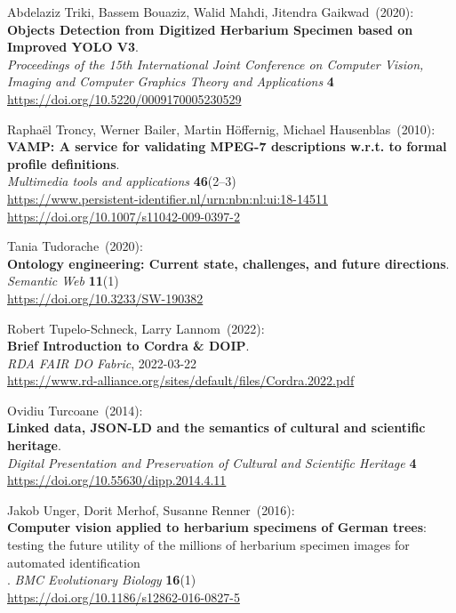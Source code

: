 \begin{thebibliography}{9}
Abdelaziz Triki, Bassem Bouaziz, Walid Mahdi, Jitendra Gaikwad~(2020): \\
\textbf{Objects Detection from Digitized Herbarium Specimen based on Improved YOLO V3}.\\
\emph{Proceedings of the 15th International Joint Conference on Computer Vision, Imaging and Computer Graphics Theory and Applications} 
\textbf{4}\\
\url{https://doi.org/10.5220/0009170005230529}

Raphaël Troncy, Werner Bailer, Martin Höffernig, Michael Hausenblas~(2010): \\
\textbf{VAMP: A service for validating MPEG-7 descriptions w.r.t. to formal profile definitions}.\\
\emph{Multimedia tools and applications} \textbf{46}(2--3) \\
\url{https://www.persistent-identifier.nl/urn:nbn:nl:ui:18-14511}\\
\url{https://doi.org/10.1007/s11042-009-0397-2}

Tania Tudorache~(2020): \\
\textbf{Ontology engineering: Current state, challenges, and future directions}.\\
\emph{Semantic Web} \textbf{11}(1)\\
\url{https://doi.org/10.3233/SW-190382}

Robert Tupelo-Schneck, Larry Lannom~(2022): \\
\textbf{Brief Introduction to Cordra \& DOIP}.\\
\emph{RDA FAIR DO Fabric}, 2022-03-22\\
\url{https://www.rd-alliance.org/sites/default/files/Cordra.2022.pdf}

Ovidiu Turcoane~(2014): \\
\textbf{Linked data, {JSON-LD} and the semantics of cultural and scientific heritage}. \\
\emph{Digital Presentation and Preservation of Cultural and Scientific Heritage} \textbf{4} \\
\url{https://doi.org/10.55630/dipp.2014.4.11}

Jakob Unger, Dorit Merhof, Susanne Renner~(2016): \\
\textbf{Computer vision applied to herbarium specimens of German trees}: testing the future utility of the
millions of herbarium specimen images for automated identification\\. 
\emph{BMC Evolutionary Biology} \textbf{16}(1)\\
\url{https://doi.org/10.1186/s12862-016-0827-5}


\end{thebibliography}
